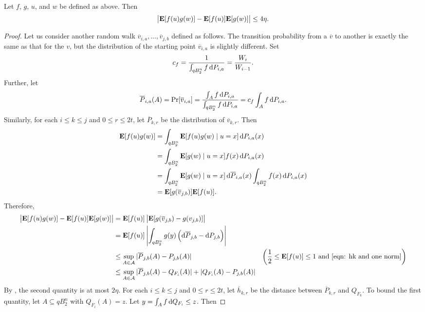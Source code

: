 \begin{lemma}
	\label{analysis lemma 2}
	Let $f$, $g$, $u$, and $w$ be defined as above. Then
	\[ \left|\textbf{E}[f(u)g(w)] - \textbf{E}[f(u)]\textbf{E}[g(w)] \right| \leq 4\eta. \]
\end{lemma}

\begin{proof}
	Let us consider another random walk $\overline{v}_{i,a},\ldots,\overline{v}_{j,b}$ defined as follows. The transition probability from a $\overline{v}$ to another is exactly the same as that for the $v$, but the distribution of the starting point $\overline{v}_{i,a}$ is slightly different. Set
	\[ c_f = \frac{1}{\int_{qB_2^n} f\operatorname{d}\!{P}_{i,a}} = \frac{W_i}{W_{i-1}}. \]
	Further, let
	\[ \overline{P}_{i,a}(A) = \Pr[\overline{v}_{i,a}] = \frac{\int_A f\operatorname{d}\!{P}_{i,a}}{\int_{qB_2^n} f\operatorname{d}\!{P}_{i,a}} = c_f\int_A f\operatorname{d}\!{P}_{i,a}. \]
	Similarly, for each $i\leq k\leq j$ and $0\leq r\leq 2t$, let $\overline{P}_{k,r}$ be the distribution of $\overline{v}_{k,r}$. Then
	\begin{align*}
		\textbf{E}[f(u)g(w)] &= \int_{qB_2^n} \textbf{E}[f(u)g(w)\mid u=x] \operatorname{d}\!{P}_{i,a}(x) \\
			&= \int_{qB_2^n} \textbf{E}[g(w)\mid u=x] f(x)\operatorname{d}\!{P}_{i,a}(x) \\
			&= \int_{qB_2^n} \textbf{E}[g(w)\mid u=x] \operatorname{d}\!{\overline{P}}_{i,a}(x) \int_{qB_2^n} f(x)\operatorname{d}\!{P}_{i,a}(x) \\
			&= \textbf{E}[g(\overline{v}_{j,b})]\textbf{E}[f(u)].
	\end{align*}
	Therefore,
	\begin{align*}
		\left| \expec[f(u)g(w)] - \expec[f(u)]\expec[g(w)] \right| &= \expec[f(u)] \left| \expec[g(\overline{v}_{j,b}) - g(v_{j,b})] \right| \\
			&= \expec[f(u)] \left| \int_{qB_2^n} g(y) \left(\d{\overline{P}}_{j,b} - \d{P}_{j,b}\right) \right| \\
			&\leq \sup_{A\in\mathcal{A}} |\overline{P}_{j,b}(A) - P_{j,b}(A)| & \left(\frac{1}{2}\leq \expec[f(u)] \leq 1 \text{ and \Cref{eqn: hk and one norm}} \right) \\
			&\leq \sup_{A\in\mathcal{A}} |\overline{P}_{j,b}(A) - Q_{F_i}(A)| + |Q_{F_i}(A) - P_{j,b}(A)|
	\end{align*}
	By , the second quantity is at most $2\eta$. %
	For each $i\leq k\leq j$ and $0\leq r\leq 2t$, let $\overline{h}_{k,r}$ be the distance between $\overline{P}_{k,r}$ and $Q_{F_k}$. To bound the first quantity, let $A\subseteq qB_2^n$ with $Q_{F_i}(A)=z$. Let $y=\int_A f\operatorname{d}\!{Q}_{F_i}\leq z$. Then

\end{proof}
